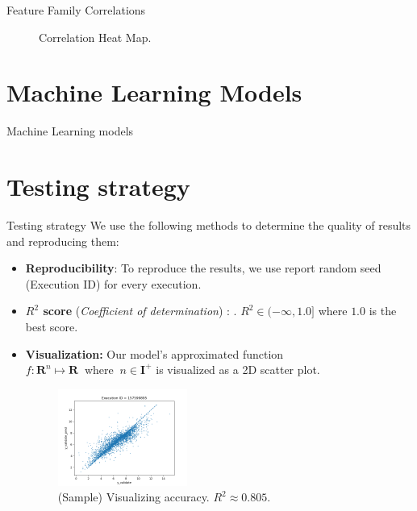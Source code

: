 \documentclass{beamer}
\begin{document}
\begin{frame}[t]{Feature Family Correlations}
\begin{figure}[htb]
\begin{subfigure}[b]{0.49\textwidth}
        \label{fig:correlationfr}
     \end{subfigure}
     \caption{Correlation Heat Map.}
     \label{fig:correlationheatmap}
\end{figure}
\end{frame}

\section{Machine Learning Models}
\begin{frame}[t]{Machine Learning models}
\end{frame}

\section{Testing strategy}

\begin{frame}[t]{Testing strategy}
We use the following methods to determine the quality of results and reproducing them:
\begin{itemize}
\item \textbf{Reproducibility}: To reproduce the results, we use report random seed (Execution ID) for every execution. 
\item \textbf{$R^2$ score} (\textit{Coefficient of determination}) \cite{r_squared_score}: . $R^2  \in (- \infty, 1.0]$ where $1.0$ is the best score. 
\item \textbf{Visualization:}
Our model's approximated function $ f : \mathbf{R}^n \mapsto \mathbf{R} \;\; \textrm{where} \;\; n \in \mathbf{I}^+$ is visualized as a 2D scatter plot.

\begin{figure}[htb]
  \centering
    \includegraphics[width=0.40\textwidth]{images/accuracy_validate}
    \caption{(Sample) Visualizing accuracy.  $R^2 \approx 0.805$.}
    \label{fig:modelQualityVisualization}
\end{figure}

\end{itemize} 
\end{frame}
\end{document}
